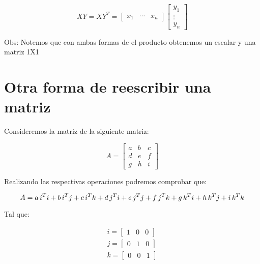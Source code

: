 \documentclass{article}
\makeatletter
\newcommand*{\bigcdot}{}%
\DeclareRobustCommand*{\bigcdot}{%
  \mathbin{\mathpalette\bigcdot@{}}%
}
\newcommand*{\bigcdot@scalefactor}{.5}
\newcommand*{\bigcdot@widthfactor}{1.15}
\newcommand*{\bigcdot@}[2]{%
  \sbox0{$#1\vcenter{}$}%
  \sbox2{$#1\cdot\m@th$}%
  \hbox to \bigcdot@widthfactor\wd2{%
    \hfil
    \raise\ht0\hbox{%
      \scalebox{\bigcdot@scalefactor}{%
        \lower\ht0\hbox{$#1\bullet\m@th$}%
      }%
    }%
    \hfil
  }%
}
\makeatother
\begin{document}
  \begin{equation}
    X \bigcdot Y = XY^{T}=  \begin{bmatrix}
                              x_{1} & \cdots & x_{n}
                            \end{bmatrix}
                            \begin{bmatrix}
                              y_{1} \\
                              \vdots \\
                              y_{n}
                            \end{bmatrix}
  \end{equation}

  Obs: Notemos que con ambas formas de el producto obtenemos un escalar y una matriz 1X1

\section{Otra forma de reescribir una matriz}

  Consideremos la matriz de la siguiente matriz:

  \begin{equation}
      A= \begin{bmatrix}
              a & b & c \\
              d & e & f \\
              g & h & i 
        \end{bmatrix}
  \end{equation}

  Realizando las respectivas operaciones podremos comprobar que:

  \begin{equation}
    A=a \thinspace {i}^{T} {i} + b \thinspace {i}^{T} {j} + c \thinspace {i}^{T} {k} +
      d \thinspace {j}^{T} {i} + e \thinspace {j}^{T} {j} + f \thinspace {j}^{T} {k} +
      g \thinspace {k}^{T} {i} + h \thinspace {k}^{T} {j} + i \thinspace {k}^{T} {k} 
  \end{equation}

  Tal que:

  \begin{gather}
    i = \begin{bmatrix}
          1 & 0 & 0
        \end{bmatrix} \\
    j = \begin{bmatrix}
          0 & 1 & 0
        \end{bmatrix} \\
    k = \begin{bmatrix}
          0 & 0 & 1
        \end{bmatrix}
  \end{gather}
\end{document}
